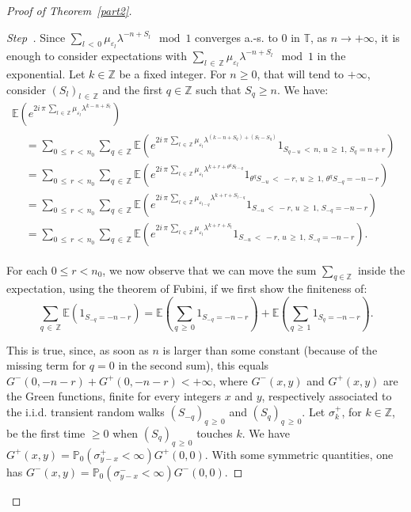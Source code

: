 \documentclass[AHL,Unicode,longabstracts,published]{cedram}
\newcommand{\Pbb}{\mathbb P}
\newcommand{\Ebb}{\mathbb E}
\newcommand{\Tbb}{\mathbb T}
\newcommand{\Zbb}{\mathbb Z}
\newcounter{stepcount}
\newenvironment{step}{\refstepcounter{stepcount}\begin{proof}[Step~\thestepcount]}{\let\qed\relax\end{proof}}
\begin{document}
\begin{proof}[{Proof of Theorem~\ref{part2}}]
\begin{step}
Since $\sum_{l\,<\,0}\mu_{\varepsilon_l}\lambda^{-n+S_l}\mod1$ converges a.-s. to 0 in $\Tbb$, as $n\rightarrow+\infty$, it is enough to consider expectations with $\sum_{l\,\in\,\Zbb}\mu_{\varepsilon_l}\lambda^{-n+S_l}\mod1$ in the exponential. Let $k\in\Zbb$ be a fixed integer. For $n\geq0$, that will tend to $+\infty$, consider $(S_l)_{l\,\in\,\Zbb}$ and the first $q\in\Zbb$ such that $S_q\geq n$. We have:
\begin{multline*}
\Ebb\left({e^{2i\,\pi\,\sum_{l\,\in\,\Zbb}\mu_{\varepsilon_l}\lambda^{k-n+S_l}}}\right)\\
\begin{aligned}
&=\sum_{0\,\leq\,r\,<\,n_0}\sum_{q\,\in\,\Zbb}\Ebb\left({e^{2i\,\pi\,\sum_{l\,\in\,\Zbb}\mu_{\varepsilon_l}\lambda^{(k-n+S_q)+(S_l-S_q)}}1_{S_{q-u}\,<\,n,\,u\,\geq\,1,\,S_{q}=n+r}}\right)\\
&=\sum_{0\,\leq\,r\,<\,n_0}\sum_{q\,\in\,\Zbb}\Ebb\left({e^{2i\,\pi\,\sum_{l\,\in\,\Zbb}\mu_{\varepsilon_l}\lambda^{k+r+\theta^qS_{l-q}}}1_{\theta^qS_{-u}\,<\,-r,\,u\,\geq\,1,\,\theta^qS_{-q}=-n-r}}\right)\\
&=\sum_{0\,\leq\,r\,<\,n_0}\sum_{q\,\in\,\Zbb}\Ebb\left({e^{2i\,\pi\,\sum_{l\,\in\,\Zbb}\mu_{\varepsilon_{l-q}}\lambda^{k+r+S_{l-q}}}1_{S_{-u}\,<\,-r,\,u\,\geq\,1,\,S_{-q}=-n-r}}\right)\\
&=\sum_{0\,\leq\,r\,<\,n_0}\sum_{q\,\in\,\Zbb}\Ebb\left({e^{2i\,\pi\,\sum_{l\,\in\,\Zbb}\mu_{\varepsilon_{l}}\lambda^{k+r+S_{l}}}1_{S_{-u}\,<\,-r,\,u\,\geq\,1,\,S_{-q}=-n-r}}\right).
\end{aligned}
\end{multline*}


For each $0\leq r<n_0$, we now observe that we can move the sum $\sum_{q\in\Zbb}$ inside the expectation, using the theorem of Fubini, if we first show the finiteness of:
\[
\sum_{q\,\in\,\Zbb}\Ebb\left({1_{S_{-q}=-n-r}}\right)=\Ebb\left({\sum_{q\,\geq\,0}1_{S_{-q}=-n-r}}\right)+\Ebb\left({\sum_{q\,\geq\,1}1_{S_{q}=-n-r}}\right).
\]

This is true, since, as soon as $n$ is larger than some constant (because of the missing term for $q=0$ in the second sum), this equals $G^-(0,-n-r)+G^+(0,-n-r)<+\infty$, where $G^-(x,y)$ and $G^+(x,y)$ are the Green functions, finite for every integers $x$ and $y$, respectively associated to the i.i.d. transient random walks $(S_{-q})_{q\,\geq\,0}$ and $(S_{q})_{q\,\geq\,0}$. Let $\sigma^+_k$, for $k\in\Zbb$, be the first time $\geq0$ when $(S_{q})_{q\,\geq\,0}$ touches $k$. We have $G^+(x,y)=\Pbb_0(\sigma^+_{y-x}<\infty)G^+(0,0)$. With some symmetric quantities, one has $G^-(x,y)=\Pbb_0(\sigma^-_{y-x}<\infty)G^-(0,0)$.


\end{step}
\end{proof}
\end{document}

